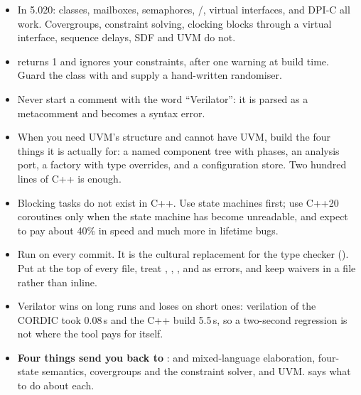 \begin{itemize}
  \item In 5.020: classes, mailboxes, semaphores, /,
        virtual interfaces,  and DPI-C all work. Covergroups,
        constraint solving, clocking blocks through a virtual interface,
        \code{\#\#} sequence delays, SDF and UVM do not.
  \item {} returns 1 and ignores your constraints, after one
         warning at build time. Guard the class with
         and supply a hand-written randomiser.
  \item Never start a comment with the word ``Verilator'': it is parsed as a
        metacomment and becomes a syntax error.
  \item When you need UVM's structure and cannot have UVM, build the four
        things it is actually for: a named component tree with phases, an
        analysis port, a factory with type overrides, and a configuration
        store. Two hundred lines of C++ is enough.
  \item Blocking tasks do not exist in C++. Use  state machines
        first; use C++20 coroutines only when the state machine has become
        unreadable, and expect to pay about 40\% in speed and much more in
        lifetime bugs.
  \item Run  on every commit. It is the
        cultural replacement for the \VHDL{} type checker
        (). Put  at the top of
        every file, treat , ,
        ,  and  as errors, and
        keep waivers in a  file rather than inline.
  \item Verilator wins on long runs and loses on short ones: verilation of the
        CORDIC took 0.08\,s and the C++ build 5.5\,s, so a two-second
        regression is not where the tool pays for itself.
  \item \textbf{Four things send you back to }: \VHDL{} and
        mixed-language elaboration, four-state semantics, covergroups and the
        constraint solver, and UVM.  says what to do
        about each.
\end{itemize}
